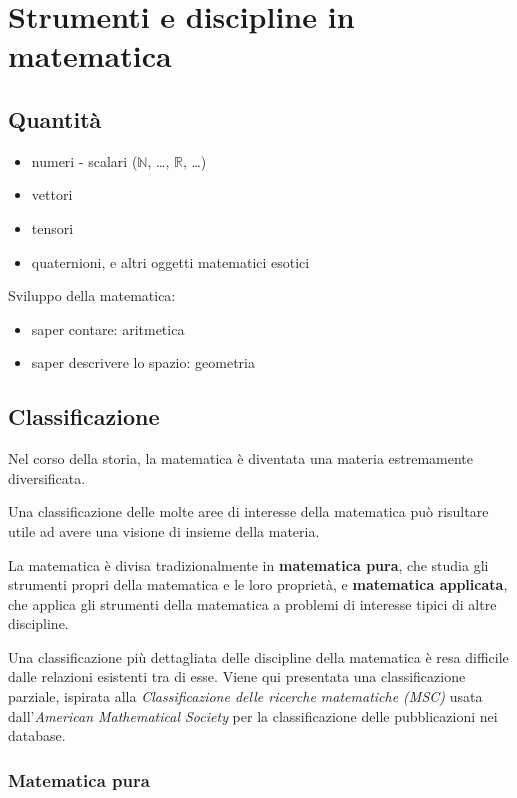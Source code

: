 
\chapter{Strumenti e discipline in matematica}

{\color{red}
\section{Quantità}
\begin{itemize}
    \item numeri - scalari ($\mathbb{N}$, \dots, $\mathbb{R}$, \dots)
    \item vettori
    \item tensori
    \item quaternioni, e altri oggetti matematici esotici
\end{itemize}
}

Sviluppo della matematica:
\begin{itemize}
    \item saper contare: aritmetica
    \item saper descrivere lo spazio: geometria
\end{itemize}


\section{Classificazione}
Nel corso della storia, la matematica è diventata una materia estremamente diversificata. 

Una classificazione delle molte aree di interesse della matematica può risultare utile ad avere una visione di insieme della materia. 

La matematica è divisa tradizionalmente in \textbf{matematica pura}, che studia gli strumenti propri della matematica e le loro proprietà, e \textbf{matematica applicata}, che applica gli strumenti della matematica a problemi di interesse tipici di altre discipline.

Una classificazione più dettagliata delle discipline della matematica è resa difficile dalle relazioni esistenti tra di esse. Viene qui presentata una classificazione parziale, ispirata alla \textit{Classificazione delle ricerche matematiche (MSC)} usata dall'\textit{American Mathematical Society} per la classificazione delle pubblicazioni nei database.

\subsection{Matematica pura}

